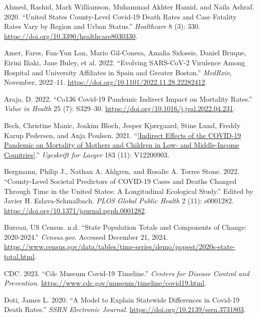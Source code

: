 \documentclass[
  letterpaper,
  DIV=11,
  numbers=noendperiod]{scrartcl}
\newlength{\cslhangindent}
\newenvironment{CSLReferences}[2] %
 {\begin{list}{}{%
  \setlength{\itemindent}{0pt}
  \setlength{\leftmargin}{0pt}
  \setlength{\parsep}{0pt}
  \ifodd #1
   \setlength{\leftmargin}{\cslhangindent}
   \setlength{\itemindent}{-1\cslhangindent}
  \fi
  \setlength{\itemsep}{#2\baselineskip}}}
 {\end{list}}
\begin{document}
\label{refs}
\begin{CSLReferences}{1}{0}
Ahmed, Rashid, Mark Williamson, Muhammad Akhter Hamid, and Naila Ashraf.
2020. {``United States County-Level Covid-19 Death Rates and Case
Fatality Rates Vary by Region and Urban Status.''} \emph{Healthcare} 8
(3): 330. \url{https://doi.org/10.3390/healthcare8030330}.

Amer, Fares, Fan-Yun Lan, Mario Gil-Conesa, Amalia Sidossis, Daniel
Bruque, Eirini Iliaki, Jane Buley, et al. 2022. {``Evolving
{SARS}-{CoV}-2 Virulence Among Hospital and University Affiliates in
{Spain} and {Greater} {Boston}.''} \emph{MedRxiv}, November, 2022--11.
\url{https://doi.org/10.1101/2022.11.28.22282412}.

Araja, D. 2022. {``Co136 Covid-19 Pandemic Indirect Impact on Mortality
Rates.''} \emph{Value in Health} 25 (7): S329--30.
\url{https://doi.org/10.1016/j.jval.2022.04.231}.

Bech, Christine Manic, Joakim Bloch, Jesper Kjærgaard, Stine Lund,
Freddy Karup Pedersen, and Anja Poulsen. 2021.
{``\href{https://www.ncbi.nlm.nih.gov/pubmed/33734073}{{[}{Indirect}
Effects of the {COVID}-19 Pandemic on Mortality of Mothers and Children
in Low- and Middle-Income Countries{]}}.''} \emph{Ugeskrift for Laeger}
183 (11): V12200903.

Bergmann, Philip J., Nathan A. Ahlgren, and Rosalie A. Torres Stone.
2022. {``County-Level Societal Predictors of {COVID}-19 Cases and Deaths
Changed Through Time in the {United} {States}: {A} Longitudinal
Ecological Study.''} Edited by Javier H. Eslava-Schmalbach. \emph{PLOS
Global Public Health} 2 (11): e0001282.
\url{https://doi.org/10.1371/journal.pgph.0001282}.

Bureau, US Census. n.d. {``State Population Totals and Components of
Change: 2020-2024.''} \emph{Census.gov}. Accessed December 21, 2024.
\url{https://www.census.gov/data/tables/time-series/demo/popest/2020s-state-total.html}.

CDC. 2023. {``Cdc Museum Covid-19 Timeline.''} \emph{Centers for Disease
Control and Prevention}.
\url{https://www.cdc.gov/museum/timeline/covid19.html}.

Doti, James L. 2020. {``A Model to Explain Statewide Differences in
Covid-19 Death Rates.''} \emph{SSRN Electronic Journal}.
\url{https://doi.org/10.2139/ssrn.3731803}.


\end{CSLReferences}
\end{document}
